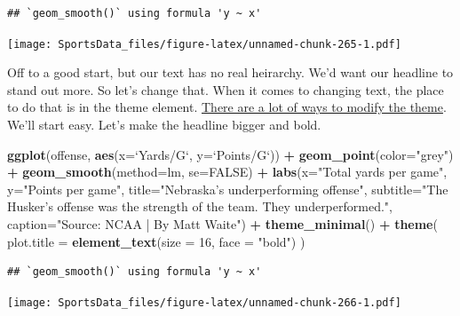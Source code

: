 \documentclass[]{book}
\newenvironment{Shaded}{\begin{snugshade}}{\end{snugshade}}
\newcommand{\DataTypeTok}[1]{\textcolor[rgb]{0.13,0.29,0.53}{#1}}
\newcommand{\DecValTok}[1]{\textcolor[rgb]{0.00,0.00,0.81}{#1}}
\newcommand{\KeywordTok}[1]{\textcolor[rgb]{0.13,0.29,0.53}{\textbf{#1}}}
\newcommand{\NormalTok}[1]{#1}
\newcommand{\OperatorTok}[1]{\textcolor[rgb]{0.81,0.36,0.00}{\textbf{#1}}}
\newcommand{\OtherTok}[1]{\textcolor[rgb]{0.56,0.35,0.01}{#1}}
\newcommand{\StringTok}[1]{\textcolor[rgb]{0.31,0.60,0.02}{#1}}
\begin{document}
\begin{verbatim}
## `geom_smooth()` using formula 'y ~ x'
\end{verbatim}

\texttt{[image: SportsData\_files/figure-latex/unnamed-chunk-265-1.pdf]}

Off to a good start, but our text has no real heirarchy. We'd want our headline to stand out more. So let's change that. When it comes to changing text, the place to do that is in the theme element. \href{http://ggplot2.tidyverse.org/reference/theme.html}{There are a lot of ways to modify the theme}. We'll start easy. Let's make the headline bigger and bold.

\begin{Shaded}
\begin{Highlighting}[]
\KeywordTok{ggplot}\NormalTok{(offense, }\KeywordTok{aes}\NormalTok{(}\DataTypeTok{x=}\StringTok{`}\DataTypeTok{Yards/G}\StringTok{`}\NormalTok{, }\DataTypeTok{y=}\StringTok{`}\DataTypeTok{Points/G}\StringTok{`}\NormalTok{)) }\OperatorTok{+}\StringTok{ }
\StringTok{  }\KeywordTok{geom_point}\NormalTok{(}\DataTypeTok{color=}\StringTok{"grey"}\NormalTok{) }\OperatorTok{+}\StringTok{ }\KeywordTok{geom_smooth}\NormalTok{(}\DataTypeTok{method=}\NormalTok{lm, }\DataTypeTok{se=}\OtherTok{FALSE}\NormalTok{) }\OperatorTok{+}\StringTok{ }
\StringTok{  }\KeywordTok{labs}\NormalTok{(}\DataTypeTok{x=}\StringTok{"Total yards per game"}\NormalTok{, }\DataTypeTok{y=}\StringTok{"Points per game"}\NormalTok{, }\DataTypeTok{title=}\StringTok{"Nebraska's underperforming offense"}\NormalTok{, }\DataTypeTok{subtitle=}\StringTok{"The Husker's offense was the strength of the team. They underperformed."}\NormalTok{, }\DataTypeTok{caption=}\StringTok{"Source: NCAA | By Matt Waite"}\NormalTok{) }\OperatorTok{+}\StringTok{ }
\StringTok{  }\KeywordTok{theme_minimal}\NormalTok{() }\OperatorTok{+}\StringTok{ }
\StringTok{  }\KeywordTok{theme}\NormalTok{(}
    \DataTypeTok{plot.title =} \KeywordTok{element_text}\NormalTok{(}\DataTypeTok{size =} \DecValTok{16}\NormalTok{, }\DataTypeTok{face =} \StringTok{"bold"}\NormalTok{)}
\NormalTok{    ) }
\end{Highlighting}
\end{Shaded}

\begin{verbatim}
## `geom_smooth()` using formula 'y ~ x'
\end{verbatim}

\texttt{[image: SportsData\_files/figure-latex/unnamed-chunk-266-1.pdf]}
\end{document}
